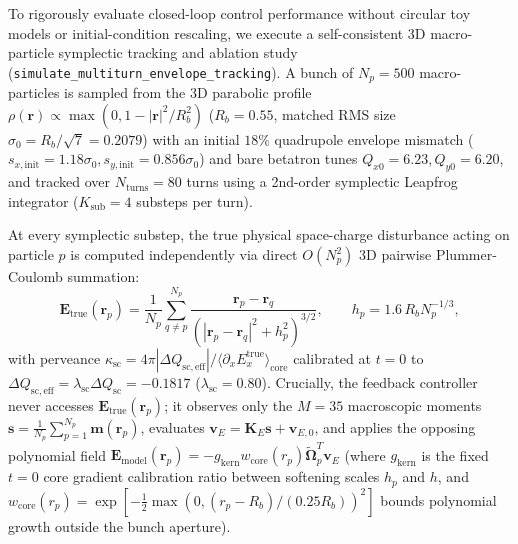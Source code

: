 \documentclass[11pt,a4paper]{article}
\newcommand{\bOmega}{\mathbf{\Omega}}
\begin{document}
To rigorously evaluate closed-loop control performance without circular toy models or initial-condition rescaling, we execute a self-consistent 3D macro-particle symplectic tracking and ablation study (\texttt{simulate\_\allowbreak multiturn\_\allowbreak envelope\_\allowbreak tracking}). A bunch of $N_p = 500$ macro-particles is sampled from the 3D parabolic profile $\rho(\bm{r}) \propto \max(0, 1 - |\bm{r}|^2/R_b^2)$ ($R_b = 0.55$, matched RMS size $\sigma_0 = R_b / \sqrt{7} = 0.2079$) with an initial $18\%$ quadrupole envelope mismatch ($s_{x,\mathrm{init}} = 1.18\sigma_0, s_{y,\mathrm{init}} = 0.856\sigma_0$) and bare betatron tunes $Q_{x0} = 6.23, Q_{y0} = 6.20$, and tracked over $N_{\mathrm{turns}} = 80$ turns using a 2nd-order symplectic Leapfrog integrator ($K_{\mathrm{sub}} = 4$ substeps per turn).

At every symplectic substep, the true physical space-charge disturbance acting on particle $p$ is computed independently via direct $O(N_p^2)$ 3D pairwise Plummer-Coulomb summation:
\begin{equation}
    \bm{E}_{\mathrm{true}}(\bm{r}_p) = \frac{1}{N_p} \sum_{q \ne p}^{N_p} \frac{\bm{r}_p - \bm{r}_q}{\left( |\bm{r}_p - \bm{r}_q|^2 + h_p^2 \right)^{3/2}}, \qquad h_p = 1.6\, R_b N_p^{-1/3},
    \label{eq:pairwise_coulomb}
\end{equation}
with perveance $\kappa_{\mathrm{sc}} = 4\pi |\Delta Q_{\mathrm{sc,eff}}| / \langle \partial_x E_x^{\mathrm{true}} \rangle_{\mathrm{core}}$ calibrated at $t=0$ to $\Delta Q_{\mathrm{sc,eff}} = \lambda_{\mathrm{sc}} \Delta Q_{\mathrm{sc}} = -0.1817$ ($\lambda_{\mathrm{sc}} = 0.80$). Crucially, the feedback controller never accesses $\bm{E}_{\mathrm{true}}(\bm{r}_p)$; it observes only the $M=35$ macroscopic moments $\bm{s} = \frac{1}{N_p} \sum_{p=1}^{N_p} \bm{m}(\bm{r}_p)$, evaluates $\bm{v}_E = \bm{K}_E\bm{s} + \bm{v}_{E,0}$, and applies the opposing polynomial field $\bm{E}_{\mathrm{model}}(\bm{r}_p) = -g_{\mathrm{kern}} w_{\mathrm{core}}(r_p) \tilde{\bOmega}_p^T \bm{v}_E$ (where $g_{\mathrm{kern}}$ is the fixed $t=0$ core gradient calibration ratio between softening scales $h_p$ and $h$, and $w_{\mathrm{core}}(r_p) = \exp[-\frac{1}{2}\max(0, (r_p - R_b)/(0.25 R_b))^2]$ bounds polynomial growth outside the bunch aperture).
\end{document}
